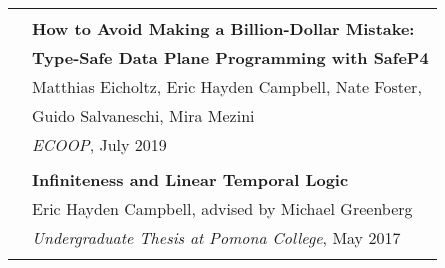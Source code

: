 \documentclass[letterpaper,10pt,oneside]{article}
\begin{document}
\begin{tabular}{@{} l l}
            & \\
            
    & \textbf{How to Avoid Making a Billion-Dollar Mistake:}\\
     & \textbf{Type-Safe Data Plane Programming with SafeP4} \\
    & Matthias Eicholtz, Eric Hayden Campbell, Nate Foster, \\ &Guido Salvaneschi, Mira Mezini \\
                     & \textit{ECOOP}, July 2019 \\
            
 
    & \\

    & \textbf{Infiniteness and Linear Temporal Logic} \\
    & Eric Hayden Campbell, advised by Michael Greenberg \\
    & \textit{Undergraduate Thesis at Pomona College}, May 2017\\

    & \\



\end{tabular}
\end{document}

